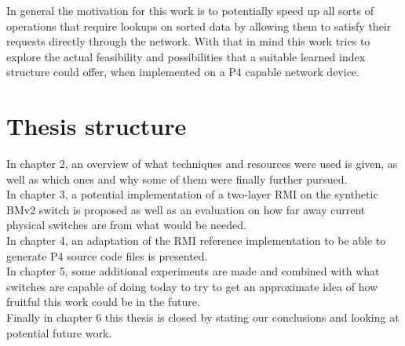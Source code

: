 In general the motivation for this work is to potentially speed up all sorts of operations that require lookups on sorted data by allowing them to satisfy their requests directly through the network. With that in mind this work tries to explore the actual feasibility and possibilities that a suitable learned index structure could offer, when implemented on a P4 capable network device.\pagebreak

\section{Thesis structure}
In chapter 2, an overview of what techniques and resources were used is given, as well as which ones and why some of them were finally further pursued.\\

\noindent
In chapter 3, a potential implementation of a two-layer RMI on the synthetic BMv2 switch is proposed as well as an evaluation on how far away current physical switches are from what would be needed.\\

\noindent
In chapter 4, an adaptation of the RMI reference implementation \cite{cdfshop} to be able to generate P4 source code files is presented.\\

\noindent
In chapter 5, some additional experiments are made and combined with what switches are capable of doing today to try to get an approximate idea of how fruitful this work could be in the future.\\

\noindent
Finally in chapter 6 this thesis is closed by stating our conclusions and looking at potential future work.
